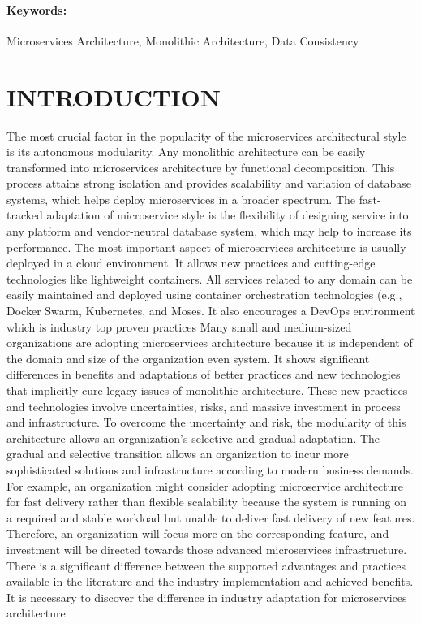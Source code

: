 \documentclass[a4paper,12pt]{article}
\begin{document}
\paragraph{Keywords:}
Microservices Architecture, Monolithic Architecture, Data Consistency 
%
%


\section*{INTRODUCTION}
%
The most crucial factor in the popularity of the microservices architectural style is its autonomous modularity.\cite{one, fifteen, cite-29} Any monolithic architecture can be easily transformed into microservices architecture by functional decomposition. This process attains strong isolation and provides scalability and variation of database systems, which helps deploy microservices in a broader spectrum. The fast-tracked adaptation of microservice style is the flexibility of designing service into any platform and vendor-neutral database system, which may help to increase its performance. The most important aspect of microservices architecture is usually deployed in a cloud environment. It allows new practices and cutting-edge technologies like lightweight containers. All services related to any domain can be easily maintained and deployed using container orchestration technologies (e.g., \cite{twentyfive}Docker Swarm, \cite{twentysix} Kubernetes, and \cite{twentyseven}Moses. It also encourages a \cite{twentyeight}DevOps environment which is industry top proven practices
Many small and medium-sized organizations are adopting microservices architecture because it is independent of the domain and size of the organization even system. It shows significant differences in benefits and adaptations of better practices and new technologies that implicitly cure legacy issues of monolithic architecture. \cite{sixteen} These new practices and technologies involve uncertainties, risks, and massive investment in process and infrastructure. To overcome the uncertainty and risk, the modularity of this architecture allows an organization's selective and gradual adaptation.
The gradual and selective transition allows an organization to incur more sophisticated solutions and infrastructure according to modern business demands. For example, an organization might consider adopting microservice architecture for fast delivery rather than flexible scalability because the system is running on a required and stable workload but unable to deliver fast delivery of new features. Therefore, an organization will focus more on the corresponding feature, and investment will be directed towards those advanced microservices infrastructure.\cite{cite-30} There is a significant difference between the supported advantages and practices available in the literature and the industry implementation and achieved benefits. It is necessary to discover the difference in industry adaptation for microservices architecture \cite{nine, eleven, five}
\end{document}
